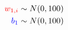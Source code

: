 \documentclass[10pt]{article}
\begin{document}
\begin{align*}
    \color{red}w_{1, i}\color{black} \sim N(0, 100)\\
    \color{blue}b_{1}\color{black} \sim N(0, 100)\\\end{align*}
\end{document}
